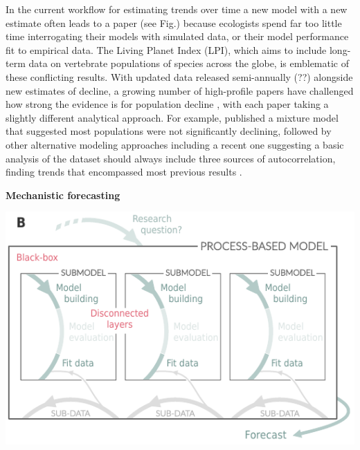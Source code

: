 \documentclass[11pt]{article}
\begin{document}
\begin{tcolorbox}
{\begin{multicols}{2}
In the current workflow for estimating trends over time a new model with a new estimate often leads to a paper (see Fig.) because ecologists spend far too little time interrogating their models with simulated data, or their model performance fit to empirical data. 
The Living Planet Index (LPI), which aims to include long-term data on vertebrate populations of species across the globe, is emblematic of these conflicting results. %
With updated data released semi-annually (??) alongside new estimates of decline, a growing number of high-profile papers have challenged how strong the evidence is for population decline \citep{Dornelas2014,gonzalez2016estimating,wagner2021insect,muller2024weather}, with each paper taking a slightly different analytical approach. For example, \citet{Leung2020} published a mixture model that suggested most populations were not significantly declining, followed by other alternative modeling approaches \citep{Buschke2021,puurtinen2022living} including a recent one suggesting a basic analysis of the dataset should always include three sources of autocorrelation, finding trends that encompassed most previous results \citep{Johnson2024}. 


\vfill

\columnbreak

\centerline{\bf Mechanistic forecasting}
\vspace*{2mm}
\begin{minipage}[t]{\linewidth}
    \includegraphics[width=\linewidth]{figures/forecasting_details}


\end{minipage}
\end{multicols}}
\end{tcolorbox}
\end{document}
